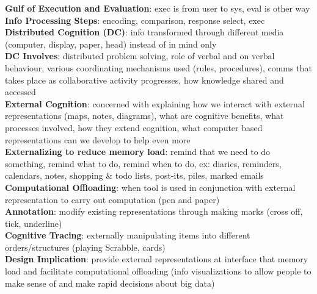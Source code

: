 \documentclass[a4paper]{article}
\begin{document}
\begin{multicols}{2}
        \textbf{Gulf of Execution and Evaluation}: exec is from user to sys, eval is other way\\
        \textbf{Info Processing Steps}: encoding, comparison, response select, exec\\
        \textbf{Distributed Cognition (DC)}: info transformed through different media (computer, display, paper, head) instead of in mind only\\
        \textbf{DC Involves}: distributed problem solving, role of verbal and on verbal behaviour, various coordinating mechanisms used (rules, procedures), comms that takes place as collaborative activity progresses, how knowledge shared and accessed\\
        \textbf{External Cognition}: concerned with explaining how we interact with external representations (maps, notes, diagrams), what are cognitive benefits, what processes involved, how they extend cognition, what computer based representations can we develop to help even more\\
        \textbf{Externalizing to reduce memory load}: remind that we need to do something, remind what to do, remind when to do, ex: diaries, reminders, calendars, notes, shopping \& todo lists, post-its, piles, marked emails\\
        \textbf{Computational Offloading}: when tool is used in conjunction with external representation to carry out computation (pen and paper)\\
        \textbf{Annotation}: modify existing representations through making marks (cross off, tick, underline)\\
        \textbf{Cognitive Tracing}: externally manipulating items into different orders/structures (playing Scrabble, cards)\\
        \textbf{Design Implication}: provide external representations at interface that memory load and facilitate computational offloading (info visualizations to allow people to make sense of and make rapid decisions about big data)\\
    \end{multicols}
    
\end{document}
